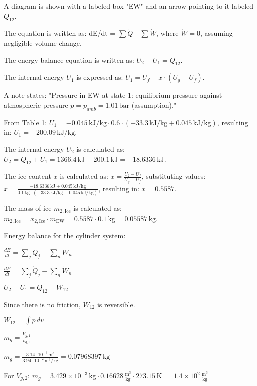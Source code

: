 A diagram is shown with a labeled box "EW" and an arrow pointing to it labeled \( Q_{12} \).

The equation is written as:
dE/dt = \( \sum \dot{Q} \) - \( \sum \dot{W} \),  
where \( \dot{W} = 0 \), assuming negligible volume change.

The energy balance equation is written as:
\( U_2 - U_1 = Q_{12} \).

The internal energy \( U_1 \) is expressed as:
\( U_1 = U_f + x \cdot (U_g - U_f) \).

A note states:
"Pressure in EW at state 1: equilibrium pressure against atmospheric pressure \( p = p_{amb} = 1.01 \, \text{bar} \) (assumption)."

From Table 1:
\( U_1 = -0.045 \, \text{kJ/kg} \cdot 0.6 \cdot (-33.3 \, \text{kJ/kg} + 0.045 \, \text{kJ/kg}) \),
resulting in:
\( U_1 = -200.09 \, \text{kJ/kg} \).

The internal energy \( U_2 \) is calculated as:
\( U_2 = Q_{12} + U_1 = 1366.4 \, \text{kJ} - 200.1 \, \text{kJ} = -18.6336 \, \text{kJ} \).

The ice content \( x \) is calculated as:
\( x = \frac{U_2 - U_f}{U_g - U_f} \),
substituting values:
\( x = \frac{-18.6336 \, \text{kJ} + 0.045 \, \text{kJ/kg}}{0.1 \, \text{kg} \cdot (-33.3 \, \text{kJ/kg} + 0.045 \, \text{kJ/kg})} \),
resulting in:
\( x = 0.5587 \).

The mass of ice \( m_{2,\text{Ice}} \) is calculated as:
\( m_{2,\text{Ice}} = x_{2,\text{Ice}} \cdot m_{\text{EW}} = 0.5587 \cdot 0.1 \, \text{kg} = 0.05587 \, \text{kg} \).

Energy balance for the cylinder system:  

\( \frac{dE}{dt} = \sum_j \dot{Q}_j - \sum_n \dot{W}_n \)  

\( \frac{dE}{dt} = \sum_j \dot{Q}_j - \sum_n \dot{W}_n \)  

\( U_2 - U_1 = Q_{12} - W_{12} \)  

Since there is no friction, \( W_{12} \) is reversible.  

\( W_{12} = \int p \, dv \)  

\( m_g = \frac{V_{g,1}}{v_{g,1}} \)  

\( m_g = \frac{3.14 \cdot 10^{-3} \, \text{m}^3}{3.94 \cdot 10^{-2} \, \text{m}^3/\text{kg}} = 0.07968397 \, \text{kg} \)

For \( V_{g,2} \):  
\( m_{g} = 3.429 \times 10^{-3} \, \text{kg} \cdot 0.16628 \, \frac{\text{m}^3}{\text{kg}} \cdot 273.15 \, \text{K} \)  
\( = 1.4 \times 10^2 \, \frac{\text{m}^3}{\text{kg}} \)  


